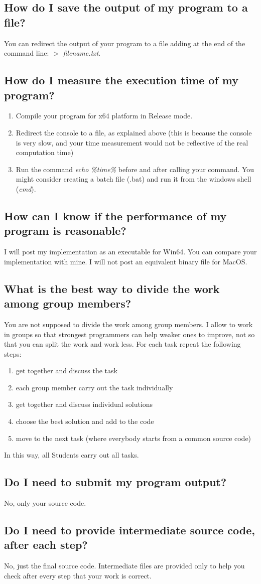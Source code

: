 \documentclass[10pt]{article}
\begin{document}
\subsection{How do I save the output of my program to a file?}
You can redirect the output of your program to a file adding at the end of the command line:  $>$ \textit{filename.txt}.
\subsection{How do I measure the execution time of my program?}
\begin{enumerate}
    \item Compile your program for x64 platform in Release mode.
    \item Redirect the console to a file, as explained above (this is because the console is very slow, and your time measurement would not be reflective of the real computation time)
    \item Run the command \textit{echo \%time\%} before and after calling your command. You might consider creating a batch file (.bat) and run it from the windows shell (\textit{cmd}).
\end{enumerate}
\subsection{How can I know if the performance of my program is reasonable?}
I will post my implementation as an executable for Win64. You can compare your implementation with mine. I will not post an equivalent binary file for MacOS.
\subsection{What is the best way to divide the work among group members?}
You are not supposed to divide the work among group members. I allow to work in groups so that strongest programmers can help weaker ones to improve, not so that you can split the work and work less. For each task repeat the following steps:
\begin{enumerate}
\item get together and discuss the task
\item each group member carry out the task individually
\item get together and discuss individual solutions
\item choose the best solution and add to the code
\item move to the next task (where everybody starts from a common source code)
\end{enumerate}
In this way, all Students carry out all tasks.
\subsection{Do I need to submit my program output?}
No, only your source code.
\subsection{Do I need to provide intermediate source code, after each step?}
No, just the final source code. Intermediate files are provided only to help you check after every step that your work is correct.
\end{document}
